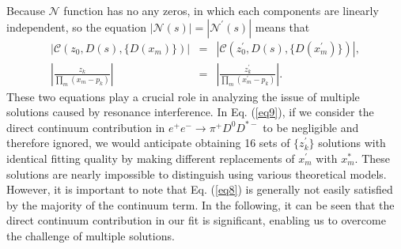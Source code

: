 \documentclass[final,5p,times,twocolumn]{elsarticle}
\begin{document}
Because $\mathcal{N}$ function has no any zeros, in which each components are linearly independent, so the equation $|\mathcal{N}(s)|=|\mathcal{N}^{\prime}(s)|$ means that
\begin{eqnarray}
\left|\mathcal{C}(z_0,D(s),\{D(x_m)\})\right|&=&\left|\mathcal{C}(z_0^{\prime},D(s),\{D(x_m^{\prime})\})\right|, \label{eq8} \\
\left|\frac{z_k}{\prod_m(x_m-p_k)}\right|&=&\left|\frac{z_k^{\prime}}{\prod_m(x_m^{\prime}-p_k)}\right|. \label{eq9}
\end{eqnarray}
These two equations play a crucial role in analyzing the issue of multiple solutions caused by resonance interference. In Eq. (\ref{eq9}), if we consider the direct continuum contribution in $e^+e^- \to\pi^+ D^0 D^{*-}$ to be negligible and therefore ignored, we would anticipate obtaining 16 sets of $\{z_k^{\prime}\}$ solutions with identical fitting quality by making different replacements of $x_m^{\prime}$ with $x_m^*$. These solutions are nearly impossible to distinguish using various theoretical models. However, it is important to note that Eq. (\ref{eq8}) is generally not easily satisfied by the majority of the continuum term.  In the following, it can be seen that the direct continuum contribution in our fit is significant, enabling us to overcome the challenge of multiple solutions.

\end{document}
